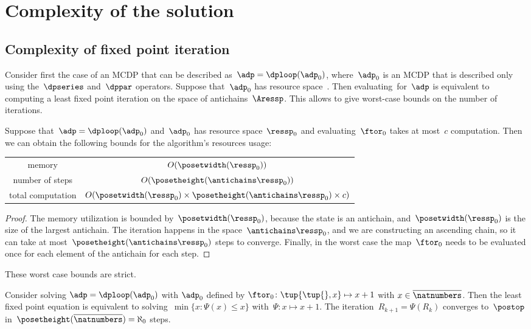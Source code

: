 

\section{Complexity of the solution}

\subsection{Complexity of fixed point iteration}

Consider first the case of an MCDP that can be described as~$\adp=\dploop(\adp_{0})$, where~$\adp_{0}$ is an MCDP that is described only using the~$\dpseries$ and~$\dppar$ operators.
Suppose that~$\adp_{0}$ has resource space~\ressp.
Then evaluating~\ftor for~$\adp$ is equivalent to computing a least fixed point iteration on the space of antichains~$\Aressp$.
This allows to give worst-case bounds on the number of iterations.

\begin{proposition}
    \label{prop:complexity}
    Suppose that~$\adp=\dploop(\adp_{0})$ and~$\adp_{0}$ has resource space~$\ressp_{0}$ and evaluating~$\ftor_{0}$ takes at most~$c$ computation.
    Then we can obtain the following bounds for the algorithm's resources usage:
    
    \smallskip{}
    \begin{tabular}{cc}
        memory & $O(\posetwidth(\ressp_{0}))$\tabularnewline
        number of steps & $O(\posetheight(\antichains\ressp_{0}))$\tabularnewline
        total computation & $O(\posetwidth(\ressp_{0})\times\posetheight(\antichains\ressp_{0})\times c)$\tabularnewline
    \end{tabular}

\end{proposition}
\begin{proof}
    The memory utilization is bounded by~$\posetwidth(\ressp_{0})$, because the state is an antichain, and~$\posetwidth(\ressp_{0})$ is the size of the largest antichain.
    The iteration happens in the space~$\antichains\ressp_{0}$, and we are constructing an ascending chain, so it can take at most~$\posetheight(\antichains\ressp_{0})$ steps to converge.
    Finally, in the worst case the map~$\ftor_{0}$ needs to be evaluated once for each element of the antichain for each step.
\end{proof}
These worst case bounds are strict.
\begin{example}
    Consider solving $\adp=\dploop(\adp_{0})$ with $\adp_{0}$ defined by $\ftor_{0}\colon\tup{ \tup{ } ,x} \mapsto x+1$ with $x\in\overline{\natnumbers}$.
    Then the least fixed point equation is equivalent to solving~$\min\{x\colon\Psi(x)\leq x\}$ with~$\Psi:x\mapsto x+1$.
    The iteration~$R_{k+1}=\Psi(R_{k})$ converges to~$\postop$ in~$\posetheight(\overline{\natnumbers})=\aleph_{0}$ steps.
\end{example}

